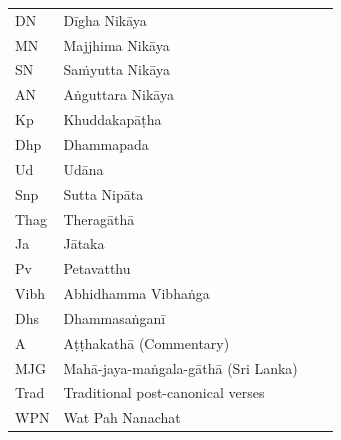 \vspace{-0.6em}
\begin{tabular}{@{}llll@{}}
  DN    & Dīgha Nikāya                                        \\
  MN    & Majjhima Nikāya                                     \\
  SN    & Saṁyutta Nikāya                                     \\
  AN    & Aṅguttara Nikāya                                    \\
  Kp    & Khuddakapāṭha                                       \\
  Dhp   & Dhammapada                                          \\
  Ud    & Udāna                                               \\
  Snp   & Sutta Nipāta                                        \\
  Thag  & Theragāthā                                          \\
  Ja    & Jātaka                                              \\
  Pv    & Petavatthu                                          \\
  Vibh  & Abhidhamma Vibhaṅga                                 \\
  Dhs   & Dhammasaṅganī                                       \\
  A     & Aṭṭhakathā (Commentary)                             \\
  MJG   & Mahā-jaya-maṅgala-gāthā (Sri Lanka)                 \\
  Trad  & Traditional post-canonical verses                   \\
  WPN   & Wat Pah Nanachat                                    \\
\end{tabular}

\else

